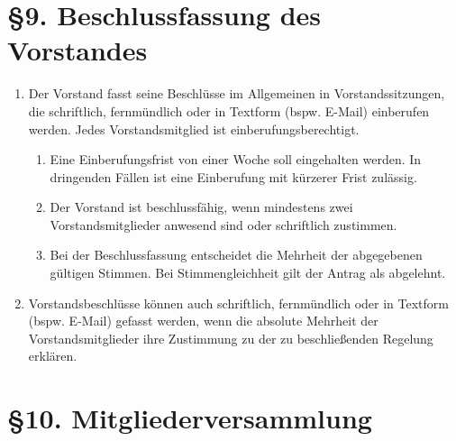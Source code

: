 \documentclass[a4paper,12pt]{article}
\begin{document}
\section*{§9. Beschlussfassung des Vorstandes}

\begin{enumerate}
    	\item
		Der Vorstand fasst seine Beschlüsse im Allgemeinen in
		Vorstandssitzungen, die schriftlich, fernmündlich oder in
		Textform (bspw. E-Mail) einberufen werden. Jedes
		Vorstandsmitglied ist einberufungsberechtigt.
    		\begin{enumerate}[label=(\roman*)]
			\item
				Eine Einberufungsfrist von einer Woche soll
				eingehalten werden. In dringenden Fällen ist
				eine Einberufung mit kürzerer Frist zulässig.
			\item
				Der Vorstand ist beschlussfähig, wenn
				mindestens zwei Vorstandsmitglieder anwesend
				sind oder schriftlich zustimmen.
			\item
				Bei der Beschlussfassung entscheidet die
				Mehrheit der abgegebenen gültigen Stimmen. Bei
				Stimmengleichheit gilt der Antrag als abgelehnt.
    		\end{enumerate}
	\item
		Vorstandsbeschlüsse können auch schriftlich, fernmündlich oder
		in Textform (bspw. E-Mail) gefasst werden, wenn die absolute
		Mehrheit der Vorstandsmitglieder ihre Zustimmung zu der zu
		beschließenden Regelung erklären.
\end{enumerate}

\section*{§10. Mitgliederversammlung}
\end{document}
